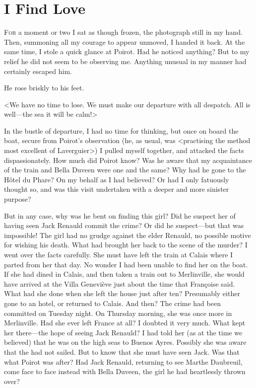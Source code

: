 \chapter{I Find Love}

\lettrine{F}{or} a moment or two I sat as though frozen, the photograph still in my hand. Then, summoning all my courage to appear unmoved, I handed it back. At the same time, I stole a quick glance at Poirot. Had he noticed anything? But to my relief he did not seem to be observing me. Anything unusual in my manner had certainly escaped him. 

 He rose briskly to his feet. 

 <We have no time to lose. We must make our departure with all despatch. All is well—the sea it will be calm!> 

 In the bustle of departure, I had no time for thinking, but once on board the boat, secure from Poirot's observation (he, as usual, was <practising the method most excellent of Laverguier>) I pulled myself together, and attacked the facts dispassionately. How much did Poirot know? Was he aware that my acquaintance of the train and Bella Duveen were one and the same? Why had he gone to the Hôtel du Phare? On my behalf as I had believed? Or had I only fatuously thought so, and was this visit undertaken with a deeper and more sinister purpose? 

 But in any case, why was he bent on finding this girl? Did he suspect her of having seen Jack Renauld commit the crime? Or did he suspect—but that was impossible! The girl had no grudge against the elder Renauld, no possible motive for wishing his death. What had brought her back to the scene of the murder? I went over the facts carefully. She must have left the train at Calais where I parted from her that day. No wonder I had been unable to find her on the boat. If she had dined in Calais, and then taken a train out to Merlinville, she would have arrived at the Villa Geneviève just about the time that Françoise said. What had she done when she left the house just after ten? Presumably either gone to an hotel, or returned to Calais. And then? The crime had been committed on Tuesday night. On Thursday morning, she was once more in Merlinville. Had she ever left France at all? I doubted it very much. What kept her there—the hope of seeing Jack Renauld? I had told her (as at the time we believed) that he was on the high seas  to Buenos Ayres. Possibly she was aware that the  had not sailed. But to know that she must have seen Jack. Was that what Poirot was after? Had Jack Renauld, returning to see Marthe Daubreuil, come face to face instead with Bella Duveen, the girl he had heartlessly thrown over? 

